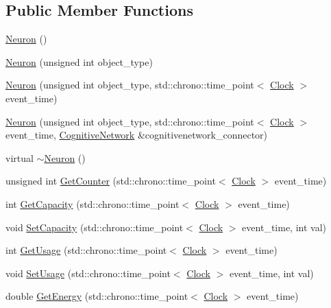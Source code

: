 \subsection*{Public Member Functions}
\begin{DoxyCompactItemize}
\item 
\hyperlink{class_neuron_a823487d01615fadb8ac19a2768dd9d96}{Neuron} ()
\item 
\hyperlink{class_neuron_acbc433cac4f27aa7f4e05be26c336aa5}{Neuron} (unsigned int object\+\_\+type)
\item 
\hyperlink{class_neuron_a4611499895417d44250c452d0fc719a6}{Neuron} (unsigned int object\+\_\+type, std\+::chrono\+::time\+\_\+point$<$ \hyperlink{universe_8h_a0ef8d951d1ca5ab3cfaf7ab4c7a6fd80}{Clock} $>$ event\+\_\+time)
\item 
\hyperlink{class_neuron_a6839febd20fb8f776151e00142411a56}{Neuron} (unsigned int object\+\_\+type, std\+::chrono\+::time\+\_\+point$<$ \hyperlink{universe_8h_a0ef8d951d1ca5ab3cfaf7ab4c7a6fd80}{Clock} $>$ event\+\_\+time, \hyperlink{class_cognitive_network}{Cognitive\+Network} \&cognitivenetwork\+\_\+connector)
\item 
virtual \hyperlink{class_neuron_aecd41febe74ef417230cd74af0c8b801}{$\sim$\+Neuron} ()
\item 
unsigned int \hyperlink{class_neuron_a0b5fe55bf939808986b3697d18a834f4}{Get\+Counter} (std\+::chrono\+::time\+\_\+point$<$ \hyperlink{universe_8h_a0ef8d951d1ca5ab3cfaf7ab4c7a6fd80}{Clock} $>$ event\+\_\+time)
\item 
int \hyperlink{class_neuron_a93cce70c19c8e70accaa31908d3f29f6}{Get\+Capacity} (std\+::chrono\+::time\+\_\+point$<$ \hyperlink{universe_8h_a0ef8d951d1ca5ab3cfaf7ab4c7a6fd80}{Clock} $>$ event\+\_\+time)
\item 
void \hyperlink{class_neuron_a8f5766ea61dc46b7a25361df540755ec}{Set\+Capacity} (std\+::chrono\+::time\+\_\+point$<$ \hyperlink{universe_8h_a0ef8d951d1ca5ab3cfaf7ab4c7a6fd80}{Clock} $>$ event\+\_\+time, int val)
\item 
int \hyperlink{class_neuron_a745b090da1b8f8fc7e3cf0ca06dfb117}{Get\+Usage} (std\+::chrono\+::time\+\_\+point$<$ \hyperlink{universe_8h_a0ef8d951d1ca5ab3cfaf7ab4c7a6fd80}{Clock} $>$ event\+\_\+time)
\item 
void \hyperlink{class_neuron_abf99856ac41b5c9c4948b3204bbc1590}{Set\+Usage} (std\+::chrono\+::time\+\_\+point$<$ \hyperlink{universe_8h_a0ef8d951d1ca5ab3cfaf7ab4c7a6fd80}{Clock} $>$ event\+\_\+time, int val)
\item 
double \hyperlink{class_neuron_a91dd5325856e246d98c2864e1c955972}{Get\+Energy} (std\+::chrono\+::time\+\_\+point$<$ \hyperlink{universe_8h_a0ef8d951d1ca5ab3cfaf7ab4c7a6fd80}{Clock} $>$ event\+\_\+time)

\end{DoxyCompactItemize}

